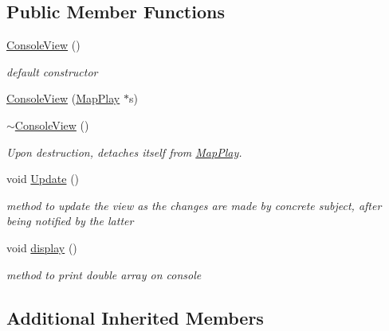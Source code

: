 \subsection*{Public Member Functions}
\begin{DoxyCompactItemize}
\item 
\hypertarget{class_console_view_afb9bf13f2b254d98756e8ac7b71836b5}{}\label{class_console_view_afb9bf13f2b254d98756e8ac7b71836b5} 
\hyperlink{class_console_view_afb9bf13f2b254d98756e8ac7b71836b5}{Console\+View} ()
\begin{DoxyCompactList}\small\item\em default constructor \end{DoxyCompactList}\item 
\hyperlink{class_console_view_a9f6167ddbbfea6f768de7ed5d8694f6e}{Console\+View} (\hyperlink{class_map_play}{Map\+Play} $\ast$s)
\item 
\hypertarget{class_console_view_a4efef4d1fbd8bece5d3a2f65964c3e1f}{}\label{class_console_view_a4efef4d1fbd8bece5d3a2f65964c3e1f} 
\hyperlink{class_console_view_a4efef4d1fbd8bece5d3a2f65964c3e1f}{$\sim$\+Console\+View} ()
\begin{DoxyCompactList}\small\item\em Upon destruction, detaches itself from \hyperlink{class_map_play}{Map\+Play}. \end{DoxyCompactList}\item 
\hypertarget{class_console_view_aa082d34551ba481dcaf536dd2532288e}{}\label{class_console_view_aa082d34551ba481dcaf536dd2532288e} 
void \hyperlink{class_console_view_aa082d34551ba481dcaf536dd2532288e}{Update} ()
\begin{DoxyCompactList}\small\item\em method to update the view as the changes are made by concrete subject, after being notified by the latter \end{DoxyCompactList}\item 
\hypertarget{class_console_view_a7dd53ef05cf17f16f2a09be3ed8f0fab}{}\label{class_console_view_a7dd53ef05cf17f16f2a09be3ed8f0fab} 
void \hyperlink{class_console_view_a7dd53ef05cf17f16f2a09be3ed8f0fab}{display} ()
\begin{DoxyCompactList}\small\item\em method to print double array on console \end{DoxyCompactList}\end{DoxyCompactItemize}
\subsection*{Additional Inherited Members}


